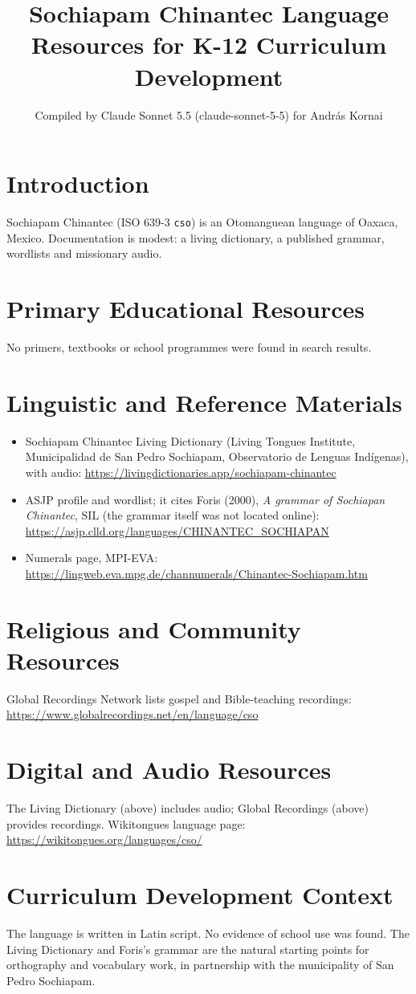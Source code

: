 \documentclass[12pt]{article}
\title{Sochiapam Chinantec Language Resources for K-12 Curriculum Development}
\author{Compiled by Claude Sonnet 5.5 (claude-sonnet-5-5) for Andr\'as Kornai}
\date{}
\begin{document}
\maketitle

\section{Introduction}
Sochiapam Chinantec (ISO 639-3 \texttt{cso}) is an Otomanguean language of Oaxaca, Mexico. Documentation is modest: a living dictionary, a published grammar, wordlists and missionary audio.

\section{Primary Educational Resources}
No primers, textbooks or school programmes were found in search results.

\section{Linguistic and Reference Materials}
\begin{itemize}
\item Sochiapam Chinantec Living Dictionary (Living Tongues Institute, Municipalidad de San Pedro Sochiapam, Observatorio de Lenguas Indígenas), with audio: \url{https://livingdictionaries.app/sochiapam-chinantec}
\item ASJP profile and wordlist; it cites Foris (2000), \emph{A grammar of Sochiapan Chinantec}, SIL (the grammar itself was not located online): \url{https://asjp.clld.org/languages/CHINANTEC_SOCHIAPAN}
\item Numerals page, MPI-EVA: \url{https://lingweb.eva.mpg.de/channumerals/Chinantec-Sochiapam.htm}
\end{itemize}

\section{Religious and Community Resources}
Global Recordings Network lists gospel and Bible-teaching recordings: \url{https://www.globalrecordings.net/en/language/cso}

\section{Digital and Audio Resources}
The Living Dictionary (above) includes audio; Global Recordings (above) provides recordings. Wikitongues language page: \url{https://wikitongues.org/languages/cso/}

\section{Curriculum Development Context}
The language is written in Latin script. No evidence of school use was found. The Living Dictionary and Foris's grammar are the natural starting points for orthography and vocabulary work, in partnership with the municipality of San Pedro Sochiapam.
\end{document}
